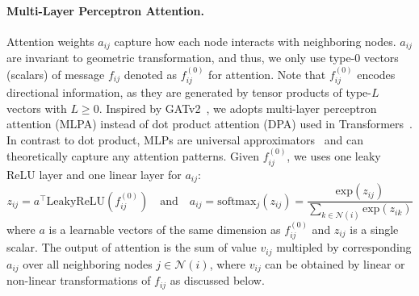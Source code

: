 \paragraph{Multi-Layer Perceptron Attention.}
Attention weights $a_{ij}$ capture how each node interacts with neighboring nodes. 
$a_{ij}$ are invariant to geometric transformation, and thus, we only use type-$0$ vectors (scalars) of message $f_{ij}$ denoted as $f_{ij}^{(0)}$ for attention.
Note that $f_{ij}^{(0)}$ encodes directional information, as they are generated by tensor products of type-$L$ vectors with $L \geq 0$.
Inspired by GATv2~\citep{gatv2}, we adopts multi-layer perceptron attention (MLPA) instead of dot product attention (DPA) used in Transformers~\citep{transformer}.
In contrast to dot product, MLPs are universal approximators~\citep{mlp_universal_approximator, approximation_mlp, approximation_sigmoid} and can theoretically capture any attention patterns. 
Given $f_{ij}^{(0)}$, we uses one leaky ReLU layer and one linear layer for $a_{ij}$:
\vspace{-1mm}
\begin{equation}
z_{ij} = a^\top \text{LeakyReLU}(f_{ij}^{(0)}) 
\quad\text{and}\quad
a_{ij} = \text{softmax}_{j}(z_{ij}) = \frac{\text{exp}(z_{ij})}{\sum_{k \in \mathcal{N}(i)} \text{exp}(z_{ik})}
\end{equation}
where $a$ is a learnable vectors of the same dimension as $f_{ij}^{(0)}$ and $z_{ij}$ is a single scalar.
The output of attention is the sum of value $v_{ij}$ multipled by corresponding $a_{ij}$ over all neighboring nodes $j \in \mathcal{N}(i)$,
where $v_{ij}$ can be obtained by linear or non-linear transformations of $f_{ij}$ as discussed below.

\vspace{-2.25mm}
